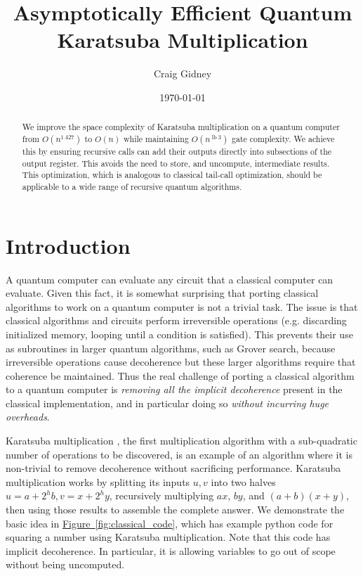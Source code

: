 \documentclass[onecolumn,unpublished]{quantumarticle}
\newcommand{\fig}[1]{\hyperref[fig:#1]{Figure~\ref*{fig:#1}}}
\def\lb{\operatorname{lb}}
\begin{document}
\title{Asymptotically Efficient Quantum Karatsuba Multiplication}

\date{\today}
\author{Craig Gidney}

\begin{abstract}
We improve the space complexity of Karatsuba multiplication on a quantum computer from $O(n^{1.427})$ to $O(n)$ while maintaining $O(n^{\lb 3})$ gate complexity.
We achieve this by ensuring recursive calls can add their outputs directly into subsections of the output register.
This avoids the need to store, and uncompute, intermediate results.
This optimization, which is analogous to classical tail-call optimization, should be applicable to a wide range of recursive quantum algorithms.
\end{abstract}

\maketitle


\section{Introduction}
\label{sec:introduction}

A quantum computer can evaluate any circuit that a classical computer can evaluate.
Given this fact, it is somewhat surprising that porting classical algorithms to work on a quantum computer is not a trivial task.
The issue is that classical algorithms and circuits perform irreversible operations (e.g. discarding initialized memory, looping until a condition is satisfied).
This prevents their use as subroutines in larger quantum algorithms, such as Grover search, because irreversible operations cause decoherence but these larger algorithms require that coherence be maintained.
Thus the real challenge of porting a classical algorithm to a quantum computer is {\em removing all the implicit decoherence} present in the classical implementation, and in particular doing so {\em without incurring huge overheads}.

Karatsuba multiplication \cite{karatsuba1962multiplication}, the first multiplication algorithm with a sub-quadratic number of operations to be discovered, is an example of an algorithm where it is non-trivial to remove decoherence without sacrificing performance.
Karatsuba multiplication works by splitting its inputs $u, v$ into two halves $u=a+2^{h} b, v=x+2^{h} y$, recursively multiplying $ax$, $by$, and $(a+b)(x+y)$, then using those results to assemble the complete answer.
We demonstrate the basic idea in \fig{classical_code}, which has example python code for squaring a number using Karatsuba multiplication.
Note that this code has implicit decoherence.
In particular, it is allowing variables to go out of scope without being uncomputed.
\end{document}
